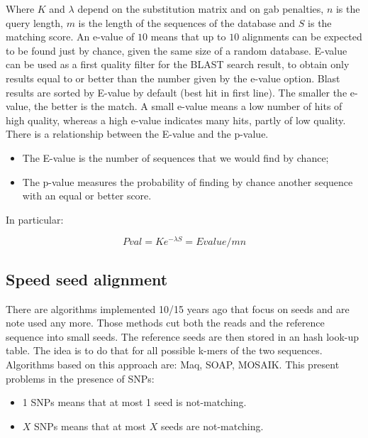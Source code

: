         Where $K$ and $\lambda$ depend on the substitution matrix and on gab penalties, $n$ is the query length, $m$ is the length of the sequences of the database and $S$ is the matching score.
        An e-value of $10$ means that up to $10$ alignments can be expected to be found just by chance, given the same size of a random database.
        E-value can be used as a first quality filter for the BLAST search result, to obtain only results equal to or better than the number given by the e-value option.
        Blast results are sorted by E-value by default (best hit in first line).
        The smaller the e-value, the better is the match.
        A small e-value means a low number of hits of high quality, whereas a high e-value indicates many hits, partly of low quality.
        There is a relationship between the E-value and the p-value.

        \begin{multicols}{2}
            \begin{itemize}
                \item The E-value is the number of sequences that we would find by chance;
                \item The p-value measures the probability of finding by chance another sequence with an equal or better score.
            \end{itemize}
        \end{multicols}

        In particular:

        $$Pval = K e^{-\lambda S} = Evalue/mn$$

    \subsection{Speed seed alignment}
    There are algorithms implemented 10/15 years ago that focus on seeds and are note used any more.
    Those methods cut both the reads and the reference sequence into small seeds.
    The reference seeds are then stored in an hash look-up table.
    The idea is to do that for all possible k-mers of the two sequences.
    Algorithms based on this approach are: Maq, SOAP, MOSAIK.
    This present problems in the presence of SNPs:

    \begin{multicols}{2}
        \begin{itemize}
            \item 1 SNPs means that at most 1 seed is not-matching.
            \item $X$ SNPs means that at most $X$ seeds are not-matching.
        \end{itemize}
    \end{multicols}


